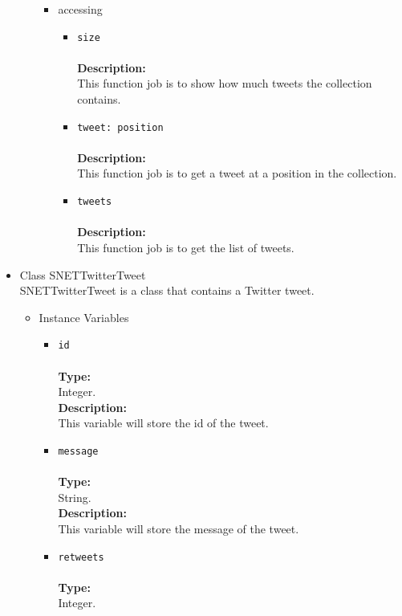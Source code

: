 \begin{itemize}
\begin{itemize}
\begin{itemize}
\item accessing
\label{sec-1-4-2-1-2-3}%
\begin{itemize}
\item \verb~size~\\\\
\textbf{Description:}\\
      This function job is to show how much tweets the collection contains.\\
\item \verb~tweet: position~\\\\
\textbf{Description:}\\
      This function job is to get a tweet at a position in the collection.\\
\item \verb~tweets~\\\\
\textbf{Description:}\\
      This function job is to get the list of tweets.
\end{itemize}

\end{itemize} %
\end{itemize} %

\item Class SNETTwitterTweet\\
\label{sec-1-4-2-2}%
SNETTwitterTweet is a class that contains a Twitter tweet.
   
\begin{itemize}

\item Instance Variables
\label{sec-1-4-2-2-1}%
\begin{itemize}
\item \verb~id~\\\\
\textbf{Type:}\\
     Integer.\\

     \textbf{Description:}\\
     This variable will store the id of the tweet.\\
\item \verb~message~\\\\
\textbf{Type:}\\
     String.\\

     \textbf{Description:}\\
     This variable will store the message of the tweet.\\
\item \verb~retweets~\\\\
\textbf{Type:}\\
     Integer.\\


\end{itemize}
\end{itemize}
\end{itemize}
